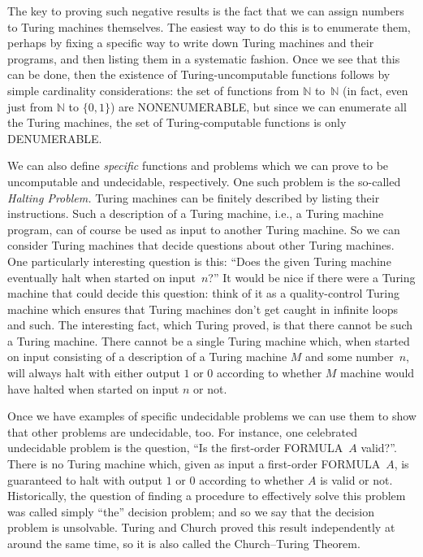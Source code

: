 \documentclass[10pt,a4paper]{article}
\newcommand*{\olup}[1]{\MakeUppercase{#1}}
\theoremstyle{plain}
\theoremstyle{definition}
\theoremstyle{remark}
\providecommand{\Nat}{\ensuremath{\mathbb{N}}}
\begin{document}
The key to proving such negative results is the fact that we can
assign numbers to Turing machines themselves.  The easiest way to do
this is to enumerate them, perhaps by fixing a specific way to write
down Turing machines and their programs, and then listing them in a
systematic fashion.  Once we see that this can be done, then the
existence of Turing-uncomputable functions follows by simple
cardinality considerations: the set of functions from $\Nat$ to~$\Nat$ (in
fact, even just from $\Nat$ to $\{0, 1\}$) are \olup{nonenumerable}, but
since we can enumerate all the Turing machines, the set of Turing-computable
functions is only \olup{denumerable}.

We can also define \emph{specific} functions and problems which we can
prove to be uncomputable and undecidable, respectively.  One such
problem is the so-called \emph{Halting Problem.} Turing machines can
be finitely described by listing their instructions.  Such a
description of a Turing machine, i.e., a Turing machine program, can
of course be used as input to another Turing machine.  So we can
consider Turing machines that decide questions about other Turing
machines.  One particularly interesting question is this: ``Does the
given Turing machine eventually halt when started on input~$n$?''  It
would be nice if there were a Turing machine that could decide this
question: think of it as a quality-control Turing machine which
ensures that Turing machines don't get caught in infinite loops and
such.  The interesting fact, which Turing proved, is that there cannot
be such a Turing machine. There cannot be a single Turing machine
which, when started on input consisting of a description of a Turing
machine $M$ and some number~$n$, will always halt with either output
$1$ or $0$ according to whether $M$ machine would have halted when
started on input $n$ or not.

Once we have examples of specific undecidable problems we can use them
to show that other problems are undecidable, too.  For instance, one
celebrated undecidable problem is the question, ``Is the first-order
\olup{formula}~$A$ valid?''.  There is no Turing machine which, given as
input a first-order \olup{formula}~$A$, is guaranteed to halt with
output $1$ or $0$ according to whether $A$ is valid or not.
Historically, the question of finding a procedure to effectively solve
this problem was called simply ``the'' decision problem; and so we say
that the decision problem is unsolvable.  Turing and Church proved this
result independently at around the same time, so it is also called the
Church--Turing Theorem.
\end{document}
